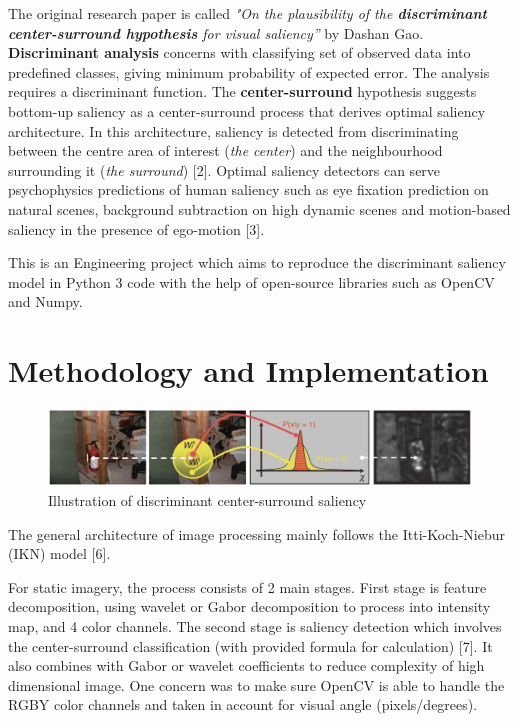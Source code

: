 \documentclass[conference]{IEEEtran}
\begin{document}
The original research paper is called  \textit{"On the plausibility of the \textbf{discriminant center-surround hypothesis} for visual saliency”} by Dashan Gao. \textbf{Discriminant analysis} concerns with classifying set of observed data into predefined classes, giving minimum probability of expected error. The analysis requires a discriminant function. The \textbf{center-surround} hypothesis suggests bottom-up saliency as a center-surround process that derives optimal saliency architecture. In this architecture, saliency is detected from discriminating between the centre area of interest (\textit{the center}) and the neighbourhood surrounding it (\textit{the surround}) [2]. Optimal saliency detectors can serve psychophysics predictions of human saliency such as eye fixation prediction on natural scenes, background subtraction on high dynamic scenes and motion-based saliency in the presence of ego-motion [3]. 

This is an Engineering project which aims to reproduce the discriminant saliency model in Python 3 code with the help of open-source libraries such as OpenCV and Numpy.

\section{Methodology and Implementation}

\begin{figure}[h]
    \centering
    \includegraphics[width=7in]{research.png}
    \caption{ Illustration of discriminant center-surround saliency}
    \label{fig:centersurround}
\end{figure}

The general architecture of image processing mainly follows the Itti-Koch-Niebur (IKN) model [6]. 

For static imagery, the process consists of 2 main stages. First stage is feature decomposition, using wavelet or Gabor decomposition to process into intensity map, and 4 color channels. The second stage is saliency detection which involves the center-surround classification (with provided formula for calculation) [7]. It also combines with Gabor or wavelet coefficients to reduce complexity of high dimensional image. One concern was to make sure OpenCV is able to handle the RGBY color channels and taken in account for visual angle (pixels/degrees). 
\end{document}
